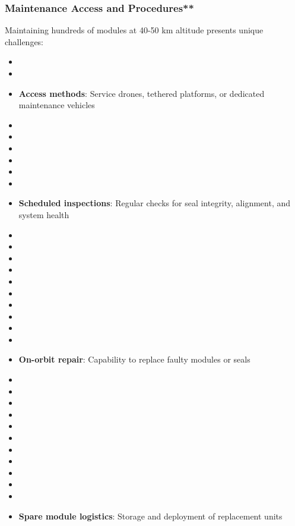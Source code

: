 \subsubsection{Maintenance Access and Procedures**}
Maintaining hundreds of modules at 40-50 km altitude presents unique challenges:
\begin{itemize}
    \item \item \item \textbf{Access methods}: Service drones, tethered platforms, or dedicated maintenance vehicles \cite{roberts2010}
    \item \item \item \item \item \item \item \textbf{Scheduled inspections}: Regular checks for seal integrity, alignment, and system health \cite{bsi2011}
    \item \item \item \item \item \item \item \item \item \item \item \textbf{On-orbit repair}: Capability to replace faulty modules or seals \cite{european_space_agency2015}
    \item \item \item \item \item \item \item \item \item \item \item \item \textbf{Spare module logistics}: Storage and deployment of replacement units \cite{huffman2010}
\end{itemize}

